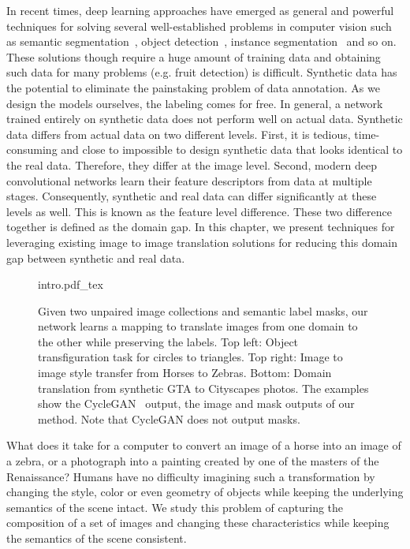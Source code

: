 In recent times, deep learning approaches have emerged as general and powerful techniques for solving several well-established problems in computer vision such as semantic segmentation~\cite{ronneberger_u-net:_2015}, object detection~\cite{russakovsky_imagenet_2015,lin_feature_2016}, instance segmentation~\cite{ren_faster_2015} and so on. These solutions though require a huge amount of training data and obtaining such data for many problems (e.g. fruit detection) is difficult. Synthetic data has the potential to eliminate the painstaking problem of data annotation. As we design the models ourselves, the labeling comes for free. In general, a network trained entirely on synthetic data does not perform well on actual data. Synthetic data differs from actual data on two different levels. First, it is tedious, time-consuming and close to impossible to design synthetic data that looks identical to the real data. Therefore, they differ at the image level. Second, modern deep convolutional networks learn their feature descriptors from data at multiple stages. Consequently, synthetic and real data can differ significantly at these levels as well. This is known as the feature level difference. These two difference together is defined as the domain gap. In this chapter, we present techniques for leveraging existing image to image translation solutions for reducing this domain gap between synthetic and real data.


\begin{figure*}[!htbp]
    \centering
    \def\svgwidth{\textwidth}
    {intro.pdf_tex}
    \caption[Overview of semantics aware image to image translation.]{Given two unpaired image collections and semantic label masks, our network learns a mapping to translate images from one domain to the other while preserving the labels. Top left: Object transfiguration task for circles to triangles. Top right: Image to image style transfer from Horses to Zebras. Bottom: Domain translation from synthetic GTA to Cityscapes photos. The examples show the CycleGAN~\cite{zhu_unpaired_2017} output, the image and mask outputs of our method. Note that CycleGAN does not output masks.}
    \label{fig:intro}
\end{figure*}

What does it take for a computer to convert an image of a horse into an image of a zebra, or a photograph into a painting created by one of the masters of the Renaissance? Humans have no difficulty imagining such a transformation by changing the style, color or even geometry of objects while keeping the underlying semantics of the scene intact. We study this problem of capturing the composition of a set of images and changing these characteristics while keeping the semantics of the scene consistent.

